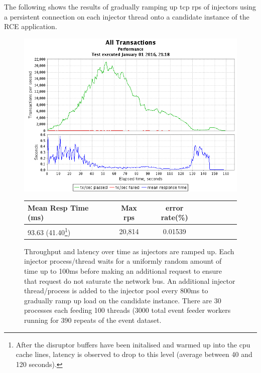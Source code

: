 \documentclass[a4paper,11pt]{scrreprt}
\begin{document}

The following shows the results of gradually ramping up \acrshort{tcp} \acrshort{rps} of injectors using a persistent connection on each injector thread onto a candidate instance of the RCE application.
\begin{figure}[h!]
\centering
\caption{Throughput and latency over time as injectors are ramped up. Each injector process/thread waits for a uniformly random amount of time up to 100ms before making an additional request to ensure that request do not saturate the network bus. An additional injector thread/process is added to the injector pool every 800ms to gradually ramp up load on the candidate instance. There are 30 processes each feeding 100 threads (3000 total event feeder workers running for 390 repeats of the event dataset.}
\includegraphics[scale=0.6, trim=0 -25 0 2, clip=true] {TCP_throughput.png}
\label{fig:udpthroughput}
\begin{tabular}{l*{6}{c}r}
Mean Resp Time (ms) & Max \acrshort{rps} & error rate(\%)\\
\hline
93.63 (41.40\footnote{After the disruptor buffers have been initalised and warmed up into the \acrshort{cpu} cache lines, latency is observed to drop to this level (average between 40 and 120 seconds).}) & 20,814 & 0.01539
\end{tabular}
\end{figure}
\end{document}
